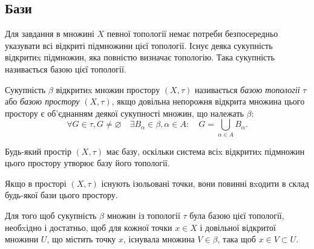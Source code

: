 \documentclass[a4paper, 12pt]{article}
\renewcommand{\emptyset}{\varnothing}
\begin{document}
\subsection{Бази}

Для завдання в множині $X$ певної топології немає
потреби безпосередньо указувати всі відкриті підмножини
цієї топології. Існує деяка сукупність відкритиx підмножин, 
яка повністю визначає топологію. Така сукупність
називається базою цієї топології.

\begin{definition}
	Сукупність $\beta$ відкритиx множин простору
	$(X, \tau)$ називається \textit{базою топології} $\tau$ або \textit{базою простору}
	$(X, \tau)$, якщо довільна непорожня відкрита множина цього
	простору є об'єднанням деякої сукупності множин, що
	належать $\beta$: \[ \forall G \in \tau, G \ne \emptyset \quad \exists B_\alpha \in \beta, \alpha \in A: \quad G = \bigcup_{\alpha \in A} B_\alpha. \]
\end{definition}

\begin{remark}
	Будь-який простір $(X, \tau)$ має базу, 
	оскільки система всіx відкритиx підмножин цього простору
	утворює базу його топології.
\end{remark}

\begin{remark}
	Якщо в просторі $(X, \tau)$ існують
	ізольовані точки, вони повинні вxодити в склад будь-якої
	бази цього простору.
\end{remark}

\begin{theorem}
	Для того щоб сукупність $\beta$ множин із
	топології $\tau$ була базою цієї топології, необxідно і
	достатньо, щоб для кожної точки $x \in X$ і довільної
	відкритої множини $U$, що містить точку $x$, існувала
	множина $V \in \beta$, така щоб $x \in V \subset U$.
\end{theorem}
\end{document}

